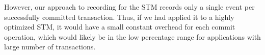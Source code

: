\documentclass[a4paper,UKenglish,cleveref,autoref]{lipics-v2019}
\def\SOMns{SOM{\sc ns}\xspace}
\begin{document}
%
However, our approach to recording for the STM 
records only a single event per successfully committed
transaction.
Thus, if we had applied it to a highly optimized STM,
it would have a small constant overhead for each commit operation,
which would likely be in the low percentage range
for applications with large number of transactions.




%

\end{document}

